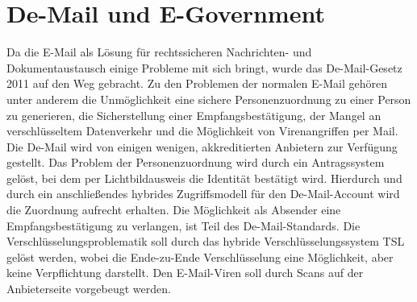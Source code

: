 \documentclass[
	12pt,
	a4paper,
	BCOR10mm,
	DIV14,
	listof=totoc,
	bibliography=totoc,
	headsepline
]{scrreprt}
\begin{document}



\section{De-Mail und E-Government}
\label{demail}
Da die E-Mail als Lösung für rechtssicheren Nachrichten- und Dokumentaustausch einige Probleme mit sich bringt, wurde das De-Mail-Gesetz 2011 auf den Weg gebracht.
Zu den Problemen der normalen E-Mail gehören unter anderem die Unmöglichkeit eine sichere Personenzuordnung zu einer Person zu generieren, die Sicherstellung einer Empfangsbestätigung, der Mangel an verschlüsseltem Datenverkehr und die Möglichkeit von Virenangriffen per Mail.
Die De-Mail wird von einigen wenigen, akkreditierten Anbietern zur Verfügung gestellt.
Das Problem der Personenzuordnung wird durch ein Antragssystem gelöst, bei dem per Lichtbildausweis die Identität bestätigt wird. 
Hierdurch und durch ein anschließendes hybrides Zugriffsmodell für den De-Mail-Account wird die Zuordnung aufrecht erhalten.
Die Möglichkeit als Absender eine Empfangsbestätigung zu verlangen, ist Teil des De-Mail-Standards.
Die Verschlüsselungsproblematik soll durch das hybride Verschlüsselungssystem TSL gelöst werden, wobei die Ende-zu-Ende Verschlüsselung eine Möglichkeit, aber keine Verpflichtung darstellt.
Den E-Mail-Viren soll durch Scans auf der Anbieterseite vorgebeugt werden.
\end{document}
